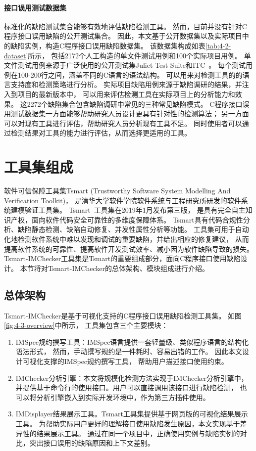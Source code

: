 \paragraph{接口误用测试数据集}
标准化的缺陷测试集合能够有效地评估缺陷检测工具。
然而，目前并没有针对C程序接口误用缺陷的公开测试集合。
因此，本文基于公开数据集以及实际项目中的缺陷实例，构造C程序接口误用缺陷数据集。
该数据集构成如表\ref{tab:4-2-dataset}所示，
包括2172个人工构造的单文件测试用例和100个实际项目用例。
单文件测试用例来源于广泛使用的公开测试集Juliet Test Suite和ITC~\cite{itc}。
每个测试用例在100-200行之间，涵盖不同的C语言的语法结构。
可以用来对检测工具的的语言支持度和检测策略进行分析。
实际项目缺陷用例来源于缺陷调研的结果，并注入到项目的最新版本中，
可以用来评估检测工具在实际项目上的分析能力和效果。
这2272个缺陷集合包含缺陷调研中常见的三种常见缺陷模式。
C程序接口误用测试数据集一方面能够帮助研究人员设计更具有针对性的检测算法；
另一方面可以对现有工具进行评估，帮助研究人员分析现有工具不足。
同时使用者可以通过检测结果对工具的能力进行评估，从而选择更适用的工具。


\section{工具集组成}
\label{sec:4.3}
软件可信保障工具集Tsmart (Trustworthy Software System Modelling And Verification Toolkit)，
是清华大学软件学院软件系统与工程研究所研发的软件系统建模验证工具集。
Tsmart~\cite{tsmart}工具集在2019年1月发布第三版，
是具有完全自主知识产权，面向软件代码安全可靠性的多维度保障体系。
Tsmart具有代码合规性分析、缺陷静态检测、缺陷自动修复、并发性属性分析等功能。
工具集可用于自动化地检测软件系统中难以发现和调试的重要缺陷，并给出相应的修复建议，
从而提高软件系统的可靠性、提高软件开发测试效率、减小因为软件缺陷导致的损失。
Tsmart-IMChecker工具集是Tsmart的重要组成部分，面向C程序接口使用缺陷设计。
本节将对Tsmart-IMChecker的总体架构、模块组成进行介绍。

\subsection{总体架构}
Tsmart-IMChecker是基于可视化支持的C程序接口误用缺陷检测工具集。
如图\ref{fig:4-3-overview}中所示，
工具集包含三个主要模块：
\begin{enumerate}
	\item IMSpec规约撰写工具：IMSpec语言提供一套轻量级、类似程序语言的结构化语法形式，
	然而，手动撰写规约是一件耗时、容易出错的工作。
	因此本文设计可视化支撑的IMSpec规约撰写工具，
	帮助用户描述接口使用约束。
	\item IMChecker分析引擎：本文将规模化检测方法实现于IMChecker分析引擎中，
	并提供基于命令行的使用接口。用户可以直接调用该接口进行缺陷检测，
	也可以将分析引擎嵌入到实际开发环境中，作为第三方插件使用。
	\item IMDisplayer结果展示工具。Tsmart工具集提供基于网页版的可视化结果展示工具。
	为帮助实际用户更好的理解接口使用缺陷发生原因，本文实现基于差异性的结果展示工具。
	通过在同一个项目中，正确使用实例与缺陷实例的对比，突出接口误用的缺陷原因和上下文差别。
\end{enumerate}

